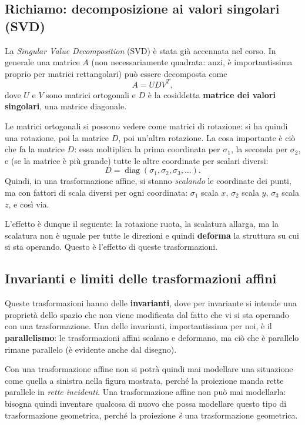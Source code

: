 \subsection{Richiamo: decomposizione ai valori singolari (SVD)}

La \emph{Singular Value Decomposition} (SVD) è stata già accennata nel corso. In generale una matrice $A$ (non necessariamente quadrata: anzi, è importantissima proprio per matrici rettangolari) può essere decomposta come
\[
  A = U D V^{T},
\]
dove $U$ e $V$ sono matrici ortogonali e $D$ è la cosiddetta \textbf{matrice dei valori singolari}, una matrice diagonale.

Le matrici ortogonali si possono vedere come matrici di rotazione: si ha quindi una rotazione, poi la matrice $D$, poi un'altra rotazione. La cosa importante è ciò che fa la matrice $D$: essa moltiplica la prima coordinata per $\sigma_1$, la seconda per $\sigma_2$, e (se la matrice è più grande) tutte le altre coordinate per scalari diversi:
\[
  D = \operatorname{diag}(\sigma_1,\sigma_2,\sigma_3,\dots).
\]
Quindi, in una trasformazione affine, si stanno \emph{scalando} le coordinate dei punti, ma con fattori di scala diversi per ogni coordinata: $\sigma_1$ scala $x$, $\sigma_2$ scala $y$, $\sigma_3$ scala $z$, e così via.

L'effetto è dunque il seguente: la rotazione ruota, la scalatura allarga, ma la scalatura non è uguale per tutte le direzioni e quindi \textbf{deforma} la struttura su cui si sta operando. Questo è l'effetto di queste trasformazioni.

\subsection{Invarianti e limiti delle trasformazioni affini}

Queste trasformazioni hanno delle \textbf{invarianti}, dove per invariante si intende una proprietà dello spazio che non viene modificata dal fatto che vi si sta operando con una trasformazione. Una delle invarianti, importantissima per noi, è il \textbf{parallelismo}: le trasformazioni affini scalano e deformano, ma ciò che è parallelo rimane parallelo (è evidente anche dal disegno).

Con una trasformazione affine non si potrà quindi mai modellare una situazione come quella a sinistra nella figura mostrata, perché la proiezione manda rette parallele in \emph{rette incidenti}. Una trasformazione affine non può mai modellarla: bisogna quindi inventare qualcosa di nuovo che possa modellare questo tipo di trasformazione geometrica, perché la proiezione \emph{è} una trasformazione geometrica.

